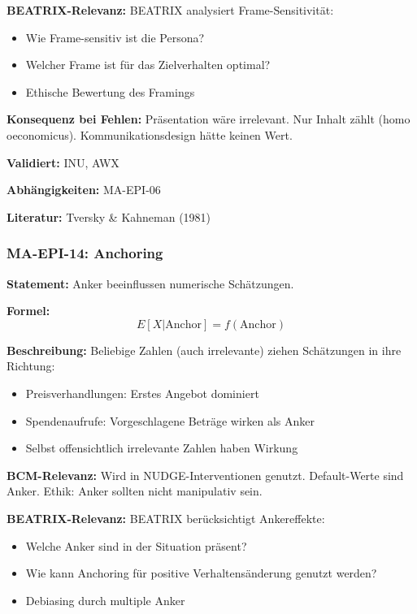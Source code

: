 \textbf{BEATRIX-Relevanz:}
BEATRIX analysiert Frame-Sensitivität:
\begin{itemize}
    \item Wie Frame-sensitiv ist die Persona?
    \item Welcher Frame ist für das Zielverhalten optimal?
    \item Ethische Bewertung des Framings
\end{itemize}

\textbf{Konsequenz bei Fehlen:}
Präsentation wäre irrelevant. Nur Inhalt zählt (homo oeconomicus). Kommunikationsdesign hätte keinen Wert.

\textbf{Validiert:} INU, AWX

\textbf{Abhängigkeiten:} MA-EPI-06

\textbf{Literatur:} Tversky \& Kahneman (1981)


\subsubsection*{MA-EPI-14: Anchoring}

\textbf{Statement:} Anker beeinflussen numerische Schätzungen.

\textbf{Formel:}
\begin{equation}
E[X|\text{Anchor}] = f(\text{Anchor})
\end{equation}

\textbf{Beschreibung:}
Beliebige Zahlen (auch irrelevante) ziehen Schätzungen in ihre Richtung:
\begin{itemize}
    \item Preisverhandlungen: Erstes Angebot dominiert
    \item Spendenaufrufe: Vorgeschlagene Beträge wirken als Anker
    \item Selbst offensichtlich irrelevante Zahlen haben Wirkung
\end{itemize}

\textbf{BCM-Relevanz:}
Wird in NUDGE-Interventionen genutzt. Default-Werte sind Anker. Ethik: Anker sollten nicht manipulativ sein.

\textbf{BEATRIX-Relevanz:}
BEATRIX berücksichtigt Ankereffekte:
\begin{itemize}
    \item Welche Anker sind in der Situation präsent?
    \item Wie kann Anchoring für positive Verhaltensänderung genutzt werden?
    \item Debiasing durch multiple Anker
\end{itemize}

